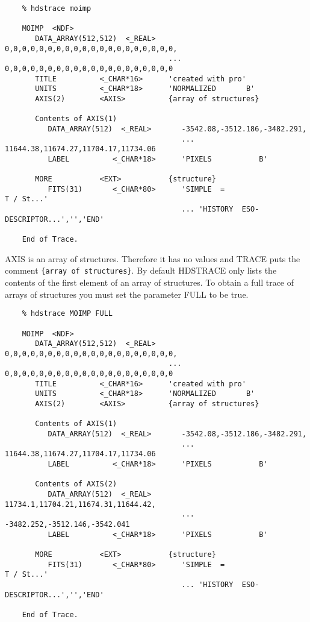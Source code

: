 \small
\begin{verbatim}
    % hdstrace moimp

    MOIMP  <NDF>
       DATA_ARRAY(512,512)  <_REAL>   0,0,0,0,0,0,0,0,0,0,0,0,0,0,0,0,0,0,0,0,
                                      ... 0,0,0,0,0,0,0,0,0,0,0,0,0,0,0,0,0,0,0,0
       TITLE          <_CHAR*16>      'created with pro'
       UNITS          <_CHAR*18>      'NORMALIZED       B'
       AXIS(2)        <AXIS>          {array of structures}

       Contents of AXIS(1)
          DATA_ARRAY(512)  <_REAL>       -3542.08,-3512.186,-3482.291,
                                         ... 11644.38,11674.27,11704.17,11734.06
          LABEL          <_CHAR*18>      'PIXELS           B'

       MORE           <EXT>           {structure}
          FITS(31)       <_CHAR*80>      'SIMPLE  =                    T / St...'
                                         ... 'HISTORY  ESO-DESCRIPTOR...','','END'

    End of Trace.
\end{verbatim}
\normalsize
AXIS is an array of structures.  Therefore it has no values and
{\footnotesize TRACE} puts the comment {\tt \{array of structures\}}.
By default {\footnotesize HDSTRACE} only lists the contents of the first
element of an array of structures.  To obtain a full trace of arrays of
structures you must set the parameter FULL to be true.

\small
\begin{verbatim}
    % hdstrace MOIMP FULL

    MOIMP  <NDF>
       DATA_ARRAY(512,512)  <_REAL>   0,0,0,0,0,0,0,0,0,0,0,0,0,0,0,0,0,0,0,0,
                                      ... 0,0,0,0,0,0,0,0,0,0,0,0,0,0,0,0,0,0,0,0
       TITLE          <_CHAR*16>      'created with pro'
       UNITS          <_CHAR*18>      'NORMALIZED       B'
       AXIS(2)        <AXIS>          {array of structures}

       Contents of AXIS(1)
          DATA_ARRAY(512)  <_REAL>       -3542.08,-3512.186,-3482.291,
                                         ... 11644.38,11674.27,11704.17,11734.06
          LABEL          <_CHAR*18>      'PIXELS           B'

       Contents of AXIS(2)
          DATA_ARRAY(512)  <_REAL>       11734.1,11704.21,11674.31,11644.42,
                                         ... -3482.252,-3512.146,-3542.041
          LABEL          <_CHAR*18>      'PIXELS           B'

       MORE           <EXT>           {structure}
          FITS(31)       <_CHAR*80>      'SIMPLE  =                    T / St...'
                                         ... 'HISTORY  ESO-DESCRIPTOR...','','END'

    End of Trace.
\end{verbatim}
\normalsize

